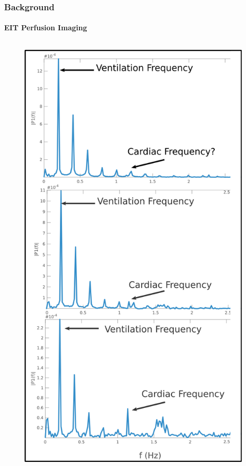 \documentclass[10pt,    %
    english,            %
    xcolor=table,       %
    envcountsect,        %
    aspectratio=1610
]{beamer}
\begin{document}
\begin{frame}
	\frametitle{Background}
	\framesubtitle{EIT Perfusion Imaging}
\begin{columns}[c]
\begin{column}{0.5\textwidth}
	\begin{figure}
		\centering
	\includegraphics[width=\textwidth,trim={0.5cm 24cm 0.5cm 1cm},clip]{imgs/FFT_img.png}

\end{figure}
\end{column}
\end{columns}
\end{frame}
\end{document}
